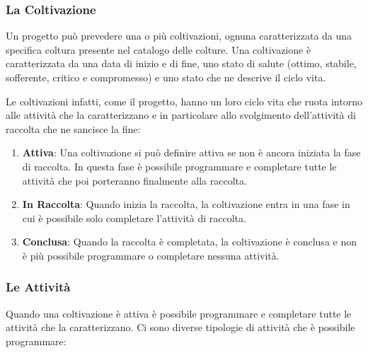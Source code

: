 \documentclass[12pt,a4paper]{article}
\begin{document}
\subsubsection{La Coltivazione}

Un progetto può prevedere una o più coltivazioni, ognuna caratterizzata da una specifica coltura presente nel catalogo delle colture. Una coltivazione è caratterizzata da una data di inizio e di fine, uno stato di salute (ottimo, stabile, sofferente, critico e compromesso) e uno stato che ne descrive il ciclo vita. 

Le coltivazioni infatti, come il progetto, hanno un loro ciclo vita che ruota intorno alle attività che la caratterizzano e in particolare allo svolgimento dell'attività di raccolta che ne sancisce la fine:

\begin{enumerate}
    \item \textbf{Attiva}: Una coltivazione si può definire attiva se non è ancora iniziata la fase di raccolta. In questa fase è possibile programmare e completare tutte le attività che poi porteranno finalmente alla raccolta.
    \item \textbf{In Raccolta}: Quando inizia la raccolta, la coltivazione entra in una fase in cui è possibile solo completare l'attività di raccolta.
    \item \textbf{Conclusa}: Quando la raccolta è completata, la coltivazione è conclusa e non è più possibile programmare o completare nessuna attività.
\end{enumerate}

\subsubsection{Le Attività}

Quando una coltivazione è attiva è possibile programmare e completare tutte le attività che la caratterizzano. Ci sono diverse tipologie di attività che è possibile programmare:
\end{document}
